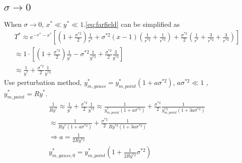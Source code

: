 \documentclass[review, 1p, number, sort&compress,table]{elsarticle}
\begin{document}
	\subsection{$\sigma\rightarrow{0}$}
	When $\sigma\rightarrow{0}$, $x^{*} \ll y^{*}\ll 1$.\autoref{eq:farfield} can be simplified as
		\begin{eqnarray}  \label{eq:farfield.01}
		\nonumber
		T^*
		\approx e^{-r^{*}-x^{*}}\left[ \left(1+\frac{\sigma^{*2}}{2} \right)  \frac{1}{r^{*}} +\sigma^{*2}\left(x-1\right) \left(\frac{1}{r^{*2}}+\frac{1}{r^{*3}}\right)
		+\frac{\sigma^{*2}}{2}\left(\frac{1}{r^{*}}+\frac{3}{r^{*2}} +\frac{3}{r^{*3}}\right)\right]
		\\ \nonumber
		\approx 1\cdot \left[ \left(1+\frac{\sigma^{*2}}{2} \right)  \frac{1}{y^{*}}-\sigma^{*2}\frac{1}{y^{*3}}
		+\frac{\sigma^{*2}}{2}\frac{3}{y^{*3}}\right]
		\\ \nonumber
		\approx  \frac{1}{y^{*}}+\frac{\sigma^{*2}}{2}\frac{1}{y^{*3}}
		\end{eqnarray} 
		Use perturbation method, $y^*_{m,gauss}=y^*_{m,point}\left(1+a\sigma^{*2}\right)$, $a\sigma^{*2}\ll1$ ,	$y^*_{m,point}=Ry^{*}$.
		\begin{eqnarray}  
		\nonumber
		\frac{1}{Ry^{*}} \approx  \frac{1}{y^{*}}+\frac{\sigma^{*2}}{2}\frac{1}{y^{*3}}
		\approx\frac{1}{y^*_{m,point}\left(1+a\sigma^{*2}\right)}+\frac{\sigma^{*2}}{2}\frac{1}{y^{*3}_{m,point}\left(1+3a\sigma^{*2}\right)}
		\\ \nonumber 
		\approx \frac{1}{Ry^{*}\left(1+a\sigma^{*2}\right)}+\frac{\sigma^{*2}}{2}\frac{1}{Ry^{*3}\left(1+3a\sigma^{*2}\right)}
		\\
		\Rightarrow a=\frac{1}{2Ry^{*2}}  \label{eq:farfield.0.a}
		\\
		y^*_{m,gauss,0}=y^{*}_{m,point}\left(1+\frac{1}{2Ry^{*2}}\sigma^{*2}\right)\label{eq:farfield.0}
		\end{eqnarray} 
		
\end{document}
